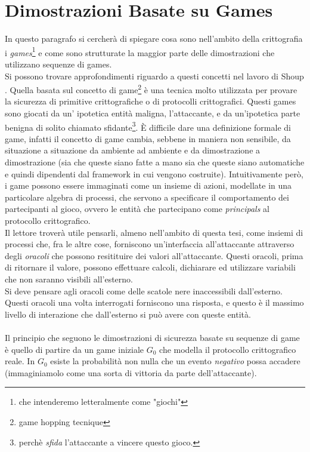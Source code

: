\documentclass[a4paper,openright,twoside,12pt]{report}
\begin{document}
\section{Dimostrazioni Basate su Games}
In questo paragrafo si cercher\`a di spiegare cosa sono nell'ambito della crittografia i \emph{games}\footnote{che intenderemo letteralmente come "giochi"} e come sono strutturate la
maggior parte delle dimostrazioni che utilizzano sequenze di games.\\Si possono trovare approfondimenti riguardo a questi concetti nel lavoro di Shoup \cite{shoup}.
Quella basata sul concetto di game\footnote{game hopping tecnique} \`e una tecnica molto utilizzata per provare la sicurezza di primitive crittografiche o di protocolli crittografici.
Questi games sono giocati da un' ipotetica entit\`a maligna, l'attaccante, e da un'ipotetica parte benigna di solito chiamato sfidante\footnote{perch\`e \emph{sfida} l'attaccante a 
vincere questo gioco.}. 
\`E difficile dare una definizione formale di game, infatti il concetto di game cambia, sebbene in maniera non sensibile, da situazione a situazione da ambiente ad ambiente e 
da dimostrazione a dimostrazione (sia che queste siano fatte a mano sia che queste siano automatiche e quindi dipendenti dal framework in cui vengono costruite).
Intuitivamente per\`o, i game possono essere immaginati come un insieme di azioni, modellate in una particolare algebra di processi, 
che servono a specificare il comportamento dei partecipanti al gioco, ovvero le entit\`a che partecipano come \emph{principals} al protocollo crittografico.\\
Il lettore trover\`a utile pensarli, almeno nell'ambito di questa tesi, come insiemi di processi che, fra le altre cose, forniscono un'interfaccia all'attaccante attraverso degli 
\emph{oracoli} che possono resitituire dei valori all'attaccante. Questi oracoli, prima di ritornare il valore, possono effettuare calcoli, dichiarare ed utilizzare variabili che non saranno
visibili all'esterno.\\Si deve pensare agli oracoli come delle scatole nere inaccessibili dall'esterno. Questi oracoli una volta interrogati forniscono una risposta,
e questo \`e il massimo livello di interazione che dall'esterno si pu\`o avere con queste entit\`a.\\ \\
Il principio che seguono le dimostrazioni di sicurezza basate su sequenze di game \`e quello di partire da un game iniziale $G_0$ che modella il protocollo crittografico reale.
In $G_0$ esiste la probabilit\`a non nulla che un evento \emph{negativo} possa accadere (immaginiamolo come una sorta di vittoria da parte dell'attaccante).
\end{document}
